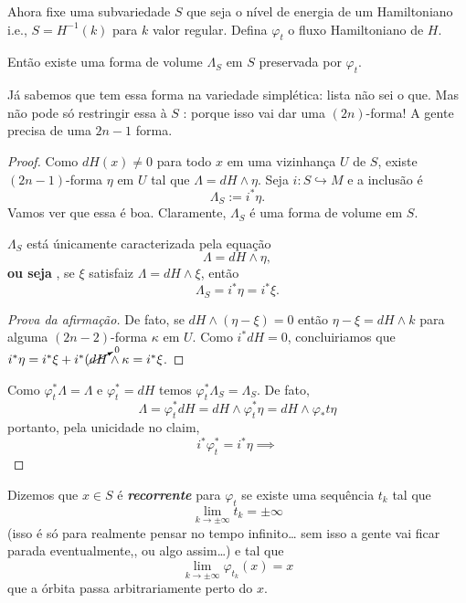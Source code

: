 Ahora fixe uma subvariedade $S$ que seja o nível de energia de um Hamiltoniano i.e., $ S=H^{-1}(k)$ para $k$ valor regular. Defina $\varphi_t$ o fluxo Hamiltoniano de $H$.

\begin{prop}\leavevmode
	Então existe uma forma de volume $\Lambda_S$ em $S$ preservada por $\varphi_t$.
\end{prop}
\begin{remark}\leavevmode
	Já sabemos que tem essa forma na variedade simplética: lista não sei o que. Mas não pode só restringir essa à $S$ : porque isso vai dar uma $(2n)$-forma! A gente precisa de uma $2n-1$ forma.
\end{remark}

\begin{proof}\leavevmode
	Como $dH(x)\neq 0$ para todo $x$ em uma vizinhança $U$ de $S$, existe $(2n-1)$-forma $\eta$ em $U$ tal que $\Lambda=dH\wedge \eta$. Seja $i:S\hookrightarrow M$ e a inclusão é
	\[\Lambda_S:=i^*\eta.\]
Vamos ver que essa é boa.	Claramente, $\Lambda_S$ é uma forma de volume em $S$. 
\begin{claim}\leavevmode
	$\Lambda_S$ está únicamente caracterizada pela equação
	\[\Lambda=dH\wedge \eta,\]
	\textbf{ou seja} , se $\xi$ satisfaiz $\Lambda=dH\wedge \xi$, então
	\[\Lambda_S=i^*\eta=i^*\xi.\]
\end{claim}
\begin{proof}[Prova da afirmação]\leavevmode
	De fato, se $dH\wedge (\eta-\xi)=0$ então $\eta- \xi=dH\wedge k$ para alguma $(2n-2)$-forma $\kappa$ em $U$. Como $i^*dH=0$, concluiriamos que $i^*\eta=i^*\xi+i^* (\cancelto{0}{dH}\wedge \kappa=i^*\xi$.
\end{proof}
Como $\varphi^*_t\Lambda=\Lambda$ e $\varphi^*_t=dH$ temos $\varphi^* _t\Lambda_S=\Lambda_S$. De fato, \[\Lambda=\varphi^*_tdH=dH\wedge \varphi^*_t\eta=dH\wedge \varphi_* t\eta\]
portanto, pela unicidade no claim, 
\[i^*\varphi^*_t=i^*\eta\implies \]
\end{proof}

\begin{defn}\leavevmode
	Dizemos que $x\in S$ é \textit{\textbf{recorrente}} para  $\varphi_t$ se existe uma sequência $t_k$ tal que
	 \[\lim_{k \to \pm \infty} t_k=\pm \infty\]
	 (isso é só para realmente pensar no tempo infinito… sem isso a gente vai ficar parada eventualmente,, ou algo assim…)	 e tal que
	 \[\lim_{k \to \pm \infty} \varphi_{t_k}(x)=x\]
	 {\color{6}que a órbita passa arbitrariamente perto do $x$.}
\end{defn}

